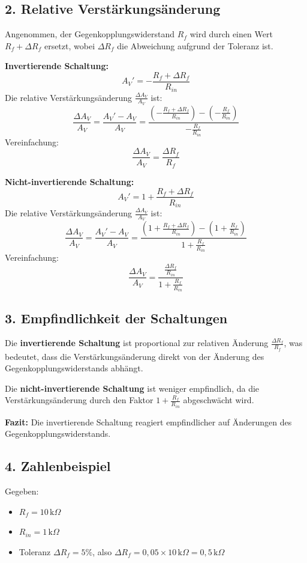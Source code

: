\documentclass[a4paper,12pt]{article}
\begin{document}
\subsection*{2. Relative Verstärkungsänderung}
Angenommen, der Gegenkopplungswiderstand \( R_f \) wird durch einen Wert \( R_f + \Delta R_f \) ersetzt, wobei \( \Delta R_f \) die Abweichung aufgrund der Toleranz ist.

\textbf{Invertierende Schaltung:}
\[
A_V' = -\frac{R_f + \Delta R_f}{R_{in}}
\]
Die relative Verstärkungsänderung \( \frac{\Delta A_V}{A_V} \) ist:
\[
\frac{\Delta A_V}{A_V} = \frac{A_V' - A_V}{A_V} = \frac{\left( -\frac{R_f + \Delta R_f}{R_{in}} \right) - \left( -\frac{R_f}{R_{in}} \right)}{-\frac{R_f}{R_{in}}}
\]
Vereinfachung:
\[
\frac{\Delta A_V}{A_V} = \frac{\Delta R_f}{R_f}
\]

\textbf{Nicht-invertierende Schaltung:}
\[
A_V' = 1 + \frac{R_f + \Delta R_f}{R_{in}}
\]
Die relative Verstärkungsänderung \( \frac{\Delta A_V}{A_V} \) ist:
\[
\frac{\Delta A_V}{A_V} = \frac{A_V' - A_V}{A_V} = \frac{\left( 1 + \frac{R_f + \Delta R_f}{R_{in}} \right) - \left( 1 + \frac{R_f}{R_{in}} \right)}{1 + \frac{R_f}{R_{in}}}
\]
Vereinfachung:
\[
\frac{\Delta A_V}{A_V} = \frac{\frac{\Delta R_f}{R_{in}}}{1 + \frac{R_f}{R_{in}}}
\]

\subsection*{3. Empfindlichkeit der Schaltungen}
Die \textbf{invertierende Schaltung} ist proportional zur relativen Änderung \( \frac{\Delta R_f}{R_f} \), was bedeutet, dass die Verstärkungsänderung direkt von der Änderung des Gegenkopplungswiderstands abhängt.

Die \textbf{nicht-invertierende Schaltung} ist weniger empfindlich, da die Verstärkungsänderung durch den Faktor \( 1 + \frac{R_f}{R_{in}} \) abgeschwächt wird.

\textbf{Fazit:} Die invertierende Schaltung reagiert empfindlicher auf Änderungen des Gegenkopplungswiderstands.

\subsection*{4. Zahlenbeispiel}
Gegeben:
\begin{itemize}
    \item \( R_f = 10 \, \text{k}\Omega \)
    \item \( R_{in} = 1 \, \text{k}\Omega \)
    \item Toleranz \( \Delta R_f = 5\% \), also \( \Delta R_f = 0,05 \times 10 \, \text{k}\Omega = 0,5 \, \text{k}\Omega \)
\end{itemize}
\end{document}
